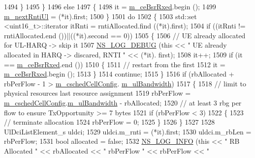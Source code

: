 \begin{DoxyCode}
1494         \}
1495     \}
1496   \textcolor{keywordflow}{else}
1497     \{
1498       it = \hyperlink{classns3_1_1TdBetFfMacScheduler_ab10364d54dad2ec2afed0c168cdad4d3}{m\_ceBsrRxed}.begin ();
1499       \hyperlink{classns3_1_1TdBetFfMacScheduler_affbc3b6450778e77fbc0e20cb575d1b0}{m\_nextRntiUl} = (*it).first;
1500     \}
1501   \textcolor{keywordflow}{do}
1502     \{
1503       std::set <uint16\_t>::iterator itRnti = rntiAllocated.find ((*it).first);
1504       \textcolor{keywordflow}{if} ((itRnti != rntiAllocated.end ())||((*it).second == 0))
1505         \{
1506           \textcolor{comment}{// UE already allocated for UL-HARQ -> skip it}
1507           \hyperlink{group__logging_ga413f1886406d49f59a6a0a89b77b4d0a}{NS\_LOG\_DEBUG} (\textcolor{keyword}{this} << \textcolor{stringliteral}{" UE already allocated in HARQ -> discared, RNTI "} << (*it).
      first);
1508           it++;
1509           \textcolor{keywordflow}{if} (it == \hyperlink{classns3_1_1TdBetFfMacScheduler_ab10364d54dad2ec2afed0c168cdad4d3}{m\_ceBsrRxed}.end ())
1510             \{
1511               \textcolor{comment}{// restart from the first}
1512               it = \hyperlink{classns3_1_1TdBetFfMacScheduler_ab10364d54dad2ec2afed0c168cdad4d3}{m\_ceBsrRxed}.begin ();
1513             \}
1514           \textcolor{keywordflow}{continue};
1515         \}
1516       \textcolor{keywordflow}{if} (rbAllocated + rbPerFlow - 1 > \hyperlink{classns3_1_1TdBetFfMacScheduler_a3e53aae0259501332769cd6ca4b74800}{m\_cschedCellConfig}.
      \hyperlink{structns3_1_1FfMacCschedSapProvider_1_1CschedCellConfigReqParameters_a5ab5b102878e6e7e7727a14af4a64d2f}{m\_ulBandwidth})
1517         \{
1518           \textcolor{comment}{// limit to physical resources last resource assignment}
1519           rbPerFlow = \hyperlink{classns3_1_1TdBetFfMacScheduler_a3e53aae0259501332769cd6ca4b74800}{m\_cschedCellConfig}.\hyperlink{structns3_1_1FfMacCschedSapProvider_1_1CschedCellConfigReqParameters_a5ab5b102878e6e7e7727a14af4a64d2f}{m\_ulBandwidth} - rbAllocated;
1520           \textcolor{comment}{// at least 3 rbg per flow to ensure TxOpportunity >= 7 bytes}
1521           \textcolor{keywordflow}{if} (rbPerFlow < 3)
1522             \{
1523               \textcolor{comment}{// terminate allocation}
1524               rbPerFlow = 0;      
1525             \}
1526         \}
1527 
1528       UlDciListElement\_s uldci;
1529       uldci.m\_rnti = (*it).first;
1530       uldci.m\_rbLen = rbPerFlow;
1531       \textcolor{keywordtype}{bool} allocated = \textcolor{keyword}{false};
1532       \hyperlink{group__logging_gafbd73ee2cf9f26b319f49086d8e860fb}{NS\_LOG\_INFO} (\textcolor{keyword}{this} << \textcolor{stringliteral}{" RB Allocated "} << rbAllocated << \textcolor{stringliteral}{" rbPerFlow "} << rbPerFlow << \textcolor{stringliteral}{"
}
\end{DoxyCode}
